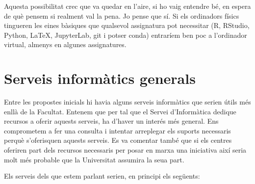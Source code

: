 \documentclass[a4paper,12pt]{article}
\begin{document}
Aquesta possibilitat crec que va quedar en l'aire, si ho vaig entendre bé, en espera de
què pensem si realment val la pena. Jo pense que sí. Si els ordinadors
físics tingueren les eines bàsiques que qualsevol assignatura pot necessitar (R, RStudio,
Python, \LaTeX, JupyterLab, git i potser conda) entraríem ben poc a l'ordinador virtual,
almenys en algunes assignatures.

\section{Serveis informàtics generals}
Entre les propostes inicials hi havia alguns serveis informàtics que serien útils més
enllà de la Facultat. Entenem que per tal que el Servei d'Informàtica dedique recursos
a oferir aquests serveis, ha d'haver un interés més general. Ens comprometem a fer una
consulta i intentar arreplegar els suports necessaris perquè s'oferisquen aquests serveis.
Es va comentar també que si els centres oferiren part dels recursos necessaris per posar
en marxa una iniciativa així seria molt més probable que la Universitat assumira la seua
part.

Els serveis dels que estem parlant serien, en principi els següents:
\end{document}
